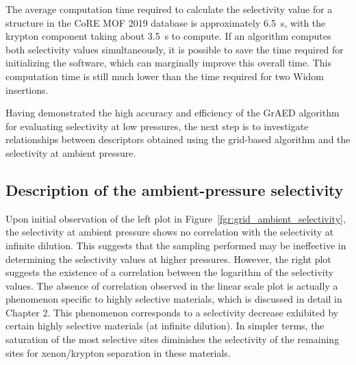 \documentclass[main]{subfiles}
\begin{document}
The average computation time required to calculate the selectivity value for a structure in the CoRE MOF 2019 database is approximately \SI{6.5}{\second}, with the krypton component taking about \SI{3.5}{\second} to compute. If an algorithm computes both selectivity values simultaneously, it is possible to save the time required for initializing the software, which can marginally improve this overall time. This computation time is still much lower than the time required for two Widom insertions.

Having demonstrated the high accuracy and efficiency of the GrAED algorithm for evaluating selectivity at low pressures, the next step is to investigate relationships between descriptors obtained using the grid-based algorithm and the selectivity at ambient pressure.

\subsection{Description of the ambient-pressure selectivity}

Upon initial observation of the left plot in Figure~\ref{fgr:grid_ambient_selectivity}, the selectivity at ambient pressure shows no correlation with the selectivity at infinite dilution. This suggests that the sampling performed may be ineffective in determining the selectivity values at higher pressures. However, the right plot suggests the existence of a correlation between the logarithm of the selectivity values. The absence of correlation observed in the linear scale plot is actually a phenomenon specific to highly selective materials, which is discussed in detail in Chapter 2. This phenomenon corresponds to a selectivity decrease exhibited by certain highly selective materials (at infinite dilution). In simpler terms, the saturation of the most selective sites diminishes the selectivity of the remaining sites for xenon/krypton separation in these materials.
\end{document}
